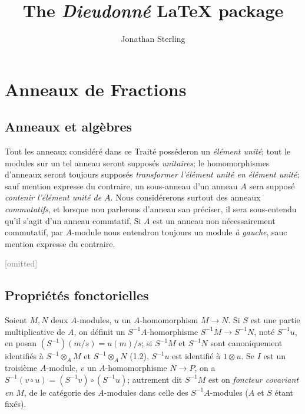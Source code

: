 \documentclass[oneside,article,french]{memoir}
\title{The \emph{Dieudonn\'e} \LaTeX{} package}
\author{Jonathan Sterling}
\begin{document}
\maketitle

\tableofcontents

\clearpage


\section{Anneaux de Fractions}

\subsection{Anneaux et alg\`ebres}

\begin{node}
  Tout les anneaux consid\'er\'e dans ce Trait\'e poss\'ederon un
  \emph{\'el\'ement unit\'e}; tout le modules sur un tel anneau seront
  suppos\'es \emph{unitaires}; le homomorphismes d'anneaux seront toujours
  suppos\'es \emph{transformer l'\'el\'ement unit\'e en \'el\'ement unit\'e};
  sauf mention expresse du contraire, un sous-anneau d'un anneau $A$ sera
  suppos\'e \emph{contenir l'\'el\'ement unit\'e de $A$}. Nous consid\'ererons
  surtout des anneaux \emph{commutatifs}, et lorsque nou parlerons  d'anneau
  san pr\'eciser, il sera sous-entendu qu'il s'agit d'un anneau commtatif. Si
  $A$ est un anneau non n\'ecessairement commutatif, par $A$-module nous
  entendron toujours un module \emph{\`a gauche}, sauc mention expresse du
  contraire.
\end{node}


\textcolor{gray}{[omitted]}

\setcounter{subsection}{2}
\subsection{Propri\'et\'es fonctorielles}

\begin{node}
  Soient $M, N$ deux $A$-modules, $u$ un $A$-homomorphism $M\to N$. Si $S$ est
  une partie multiplicative de $A$, on d\'efinit un $S^{-1}A$-homorphisme
  $S^{-1}M\to S^{-1}N$, not\'e $S^{-1}u$, en posan $(S^{-1})(m/s) = u(m)/s$; si
  $S^{-1}M$ et $S^{-1}N$ sont canoniquement identifi\'es \`a
  $S^{-1}\otimes_{A}M$ et $S^{-1}\otimes_{A}N$ (1.2),
  $S^{-1}u$ est identifi\'e \`a $1\otimes u$. Se $I$ est un troisi\`eme
  $A$-module, $v$ un $A$-homomorphisme $N\to P$, on a $S^{-1}(v\circ u) =
  (S^{-1}v)\circ (S^{-1}u)$; autrement dit $S^{-1}M$ est on \emph{foncteur
  covariant en $M$}, de le cat\'egorie des $A$-modules dans celle des
  $S^{-1}A$-modules ($A$ et $S$ \'etant fix\'es).
\end{node}
\end{document}
